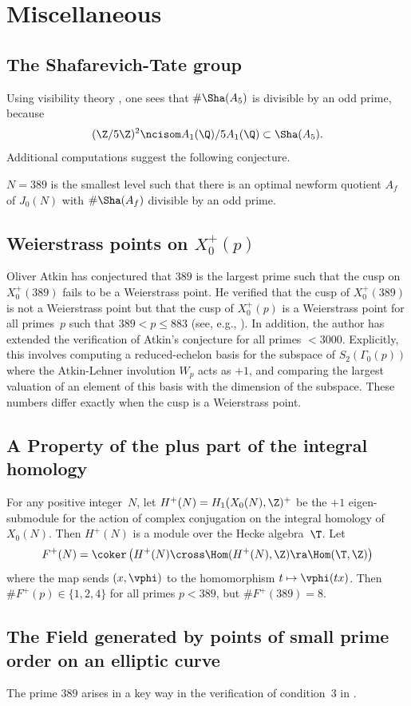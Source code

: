 \documentclass{report}
\begin{document}
\section{Miscellaneous}

\subsection{The Shafarevich-Tate group}\label{sec:sha}
Using visibility theory \cite[\S4.2]{agashe-stein:visibility},
one sees that $\#\Sha(A_5)$ is divisible by an odd prime, because
$$
 (\Z/5\Z)^2 \ncisom A_1(\Q)/5 A_1(\Q) \subset \Sha(A_{5}).
$$
Additional computations suggest the following conjecture.
\begin{conjecture}
$N=389$ is the smallest level such that there is an optimal newform
quotient $A_f$ of $J_0(N)$ with $\#\Sha(A_f)$
divisible by an odd prime.
\end{conjecture}


\subsection{Weierstrass points on $X_0^+(p)$}\label{sec:atkin}
Oliver Atkin has conjectured that $389$ is the largest prime such that
the cusp on $X_0^+(389)$ fails to be a Weierstrass point.  He verified
that the cusp of $X_0^+(389)$ is not a Weierstrass point but
that the cusp of $X_0^+(p)$ is a Weierstrass point for all primes~$p$
such that $389<p\leq 883$ (see, e.g., \cite[pg.39]{elkies:ffield}).
In addition, the author has extended the verification of Atkin's conjecture
for all primes $<3000$.    Explicitly, this involves computing a reduced-echelon
basis for the subspace of $S_2(\Gamma_0(p))$ where the Atkin-Lehner involution
$W_p$ acts as $+1$, and comparing the largest valuation of an element of this
basis with the dimension of the subspace.  These numbers differ exactly when
the cusp is a Weierstrass point.



\subsection{A Property of the plus part of the integral homology}
For any positive integer~$N$, let $H^+(N) = H_1(X_0(N),\Z)^+$ be the
$+1$ eigen-submodule for the action of complex conjugation on the
integral homology of $X_0(N)$.  Then $H^+(N)$ is a module over the
Hecke algebra~$\T$.  Let
$$
 F^+(N) = \coker\left(H^+(N) \cross \Hom(H^+(N),\Z) \ra \Hom(\T,\Z)\right)
$$
where the map sends $(x,\vphi)$ to the homomorphism
$t\mapsto \vphi(tx)$.  Then $\#F^+(p)\in \{1,2,4\}$ for
all primes $p<389$, but $\#F^+(389) = 8$.

\subsection{The Field generated by points of
   small prime order on an elliptic curve}
The prime $389$ arises in a key way in the verification of condition~3
in \cite{merel-stein}.




\end{document}

